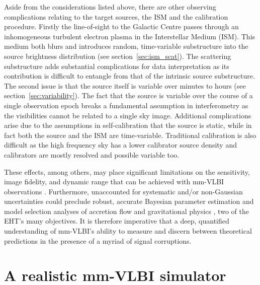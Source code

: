 Aside from the considerations listed above, there are other observing complications relating to the target sources, the ISM and the calibration procedure. Firstly the line-of-sight to the Galactic Centre passes through an inhomogeneous turbulent electron plasma in the Interstellar Medium (ISM). This medium both blurs and introduces random, time-variable substructure into the source brightness distribution (see section~\ref{sec:ism_scat}). The scattering substructure adds substantial complications for data interpretation as its contribution is difficult to entangle from that of the intrinsic source substructure. The second issue is that the source itself is variable over minutes to hours (see section~\ref{sec:variability}). The fact that the source is variable over the course of a single observation epoch breaks a fundamental assumption in interferometry as the visibilities cannot be related to a single sky image. Additional complications arise due to the assumptions in self-calibration that the source is static, while in fact both the source and the ISM are time-variable. Traditional calibration is also difficult as the high frequency sky has a lower calibrator source density and calibrators are mostly resolved and possible variable too. 


These effects, among others, may place significant limitations on the sensitivity, image fidelity, and dynamic range that can be achieved with mm-VLBI observations \citep{Blecher_2016}.  Furthermore, unaccounted for systematic and/or non-Gaussian uncertainties could preclude robust, accurate Bayesian parameter estimation and model selection analyses of accretion flow \citep[e.g.][]{Broderick_2016} and gravitational physics \citep[e.g.][]{Broderick_2014, Psaltis_2016}, two of the EHT's many objectives. It is therefore imperative that a deep, quantified understanding of mm-VLBI's ability to measure and discern between theoretical predictions in the presence of a myriad of signal corruptions.


\section{A realistic mm-VLBI simulator}

